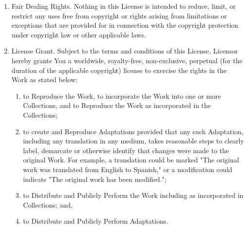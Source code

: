 \documentclass{article}
\begin{document}
{\begin{enumerate}
\begin{enumerate}
		\item "Publicly Perform" means to perform public recitations of the Work and to communicate to the public those public recitations, by any means or process, including by wire or wireless means or public digital performances; to make available to the public Works in such a way that members of the public may access these Works from a place and at a place individually chosen by them; to perform the Work to the public by any means or process and the communication to the public of the performances of the Work, including by public digital performance; to broadcast and rebroadcast the Work by any means including signs, sounds or images.
		\item "Reproduce" means to make copies of the Work by any means including without limitation by sound or visual recordings and the right of fixation and reproducing fixations of the Work, including storage of a protected performance or phonogram in digital form or other electronic medium.
	\end{enumerate}
	\item Fair Dealing Rights. Nothing in this License is intended to reduce, limit, or restrict any uses free from copyright or rights arising from limitations or exceptions that are provided for in connection with the copyright protection under copyright law or other applicable laws.
	\item License Grant. Subject to the terms and conditions of this License, Licensor hereby grants You a worldwide, royalty-free, non-exclusive, perpetual (for the duration of the applicable copyright) license to exercise the rights in the Work as stated below:
	\begin{enumerate}
		\item to Reproduce the Work, to incorporate the Work into one or more Collections, and to Reproduce the Work as incorporated in the Collections;
		\item to create and Reproduce Adaptations provided that any such Adaptation, including any translation in any medium, takes reasonable steps to clearly label, demarcate or otherwise identify that changes were made to the original Work. For example, a translation could be marked "The original work was translated from English to Spanish," or a modification could indicate "The original work has been modified.";
		\item to Distribute and Publicly Perform the Work including as incorporated in Collections; and,
		\item to Distribute and Publicly Perform Adaptations.

\end{enumerate}
\end{enumerate}}
\end{document}
